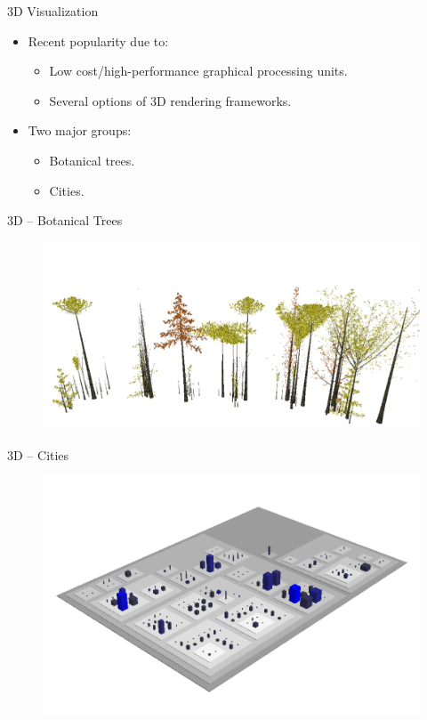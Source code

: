 \documentclass[handout]{beamer}
\begin{document}
\begin{frame}{3D Visualization}
    \begin{itemize}
        \item Recent popularity due to:
        \begin{itemize}
            \item Low cost/high-performance graphical processing units.
            \item Several options of 3D rendering frameworks.
        \end{itemize}
        \item Two major groups:
        \begin{itemize}
            \item Botanical trees.
            \item Cities.
        \end{itemize}
    \end{itemize}
\end{frame}

\begin{frame}{3D -- Botanical Trees}
    \begin{figure}
    \includegraphics[width=\textwidth]{../figures/erra2012towards}
    \end{figure}
\end{frame}

\begin{frame}{3D -- Cities}
    \begin{figure}
    \includegraphics[width=.95\textwidth]{../figures/wettel2007program}
    \end{figure}
\end{frame}
\end{document}

